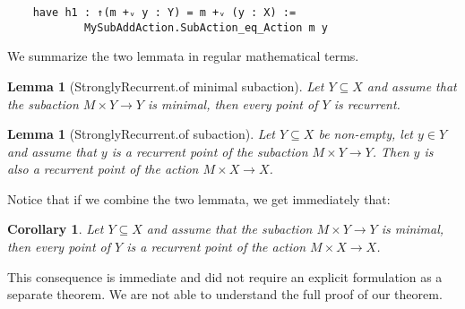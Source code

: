 \documentclass[11pt]{article}
\newtheorem{lemma}[theorem]{Lemma}
\newtheorem{corollary}[theorem]{Corollary}
\theoremstyle{definition}              %
\theoremstyle{definition}              %
\theoremstyle{definition}              %
\begin{document}
\begin{lstlisting}
    have h1 : ↑(m +ᵥ y : Y) = m +ᵥ (y : X) :=
            MySubAddAction.SubAction_eq_Action m y
\end{lstlisting}

We summarize the two lemmata in regular mathematical terms.

\begin{lemma}[StronglyRecurrent.of minimal subaction]\label{lem2}
    Let $Y \subseteq X$ and assume that the subaction $M \times Y \to Y$ is minimal, then every point of $Y$ is recurrent.
\end{lemma}

\begin{lemma}[StronglyRecurrent.of subaction]\label{lem3}
    Let $Y \subseteq X$ be non-empty, let $y \in Y$ and assume that $y$ is a recurrent point of the subaction $M \times Y \to Y$. Then $y$ is also a recurrent point of the action $M \times X \to X$.
\end{lemma}

Notice that if we combine the two lemmata, we get immediately that:

\begin{corollary}
    Let $Y \subseteq X$ and assume that the subaction $M \times Y \to Y$ is minimal, then every point of $Y$ is a recurrent point of the action $M \times X \to X$.
\end{corollary}

This consequence is immediate and did not require an explicit formulation as a separate theorem. We are not able to understand the full proof of our theorem.
\end{document}
